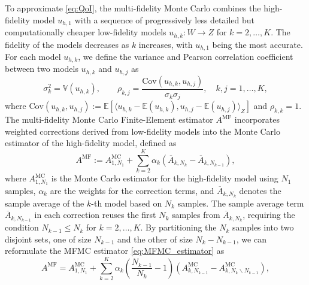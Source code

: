 \documentclass[final,3p,times,11pt]{elsarticle}
\begin{document}
To approximate \eqref{eq:QoI}, the multi-fidelity Monte Carlo combines the high-fidelity model $u_{h,1}$ with a sequence of progressively less detailed but computationally cheaper low-fidelity models $u_{h,k}: W \rightarrow Z$ for $k=2,\ldots,K$. The fidelity of the models decreases as $k$ increases, with $u_{h,1}$ being the most accurate. For each model $u_{h,k}$, we define the variance and Pearson correlation coefficient between two models $u_{h,k}$ and $u_{h,j}$ as
%
\begin{equation*}
    \sigma_k^2 = \mathbb{V}\left(u_{h,k}\right),\qquad \rho_{k,j} = \frac{\text{Cov}\left(u_{h,k},u_{h,j}\right)}{\sigma_k\sigma_j}, \quad k,j=1,\dots, K,
\end{equation*}
%
where $\text{Cov}(u_{h,k},u_{h,j}) := \mathbb{E}[\langle u_{h,k} - \mathbb{E}(u_{h,k}), u_{h,j} - \mathbb{E}(u_{h,j})\rangle_Z]$ and $\rho_{k,k}=1$.
The multi-fidelity Monte Carlo Finite-Element estimator $A^{\text{MF}}$ incorporates weighted corrections derived from low-fidelity models into the  Monte Carlo estimator of the high-fidelity model, defined as
%
\begin{equation}\label{eq:MFMC_estimator}
    A^{\text{MF}} := A^{\text{MC}}_{1,N_1} + \sum_{k=2}^K \alpha_k\left(\overline{A}_{k,N_k} - \overline{A}_{k,N_{k-1}} \right),
\end{equation}
%
where $A^{\text{MC}}_{1,N_1} $ is the Monte Carlo estimator for the high-fidelity model using $N_1$ samples, $\alpha_k$ are the weights for the correction terms, and $\overline{A}_{k,N_k}$ denotes the sample average of the $k$-th model based on $N_k$ samples. The sample average term $\overline{A}_{k,N_{k-1}}$ in each correction reuses the first $N_{k}$ samples from $\overline{A}_{k,N_{k}}$, requiring the condition $N_{k-1}\le N_k$ for $k=2,\ldots, K$. By partitioning the $N_k$ samples into two disjoint sets, one of size $N_{k-1}$ and the other of size $N_k - N_{k-1}$, we can reformulate the MFMC estimator \eqref{eq:MFMC_estimator} as
%
\begin{equation}\label{eq:MFMC_estimator_independent}
    A^{\text{MF}} = A^{\text{MC}}_{1,N_1} +  \sum_{k=2}^K \alpha_k\left(\frac{N_{k-1}}{N_{k}}-1\right)\left(A_{k,N_{k-1}}^{\text{MC}}- A_{k,N_k\backslash N_{k-1}}^{\text{MC}}\right),
\end{equation}
\end{document}
